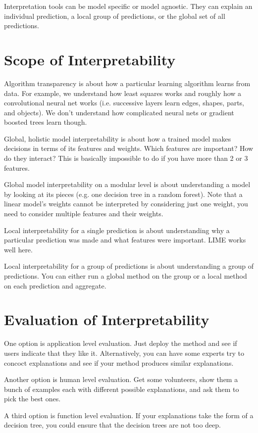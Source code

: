 \documentclass[a4paper]{article}
\begin{document}
Interpretation tools can be model specific or model agnostic. They can
explain an individual prediction, a local group of predictions, or the global
set of all predictions.

\section{Scope of Interpretability}
Algorithm transparency is about how a particular learning algorithm learns from
data.
For example, we understand how least squares works and roughly how a
convolutional neural net works (i.e. successive layers learn edges, shapes,
parts, and objects). We don't understand how complicated neural nets or
gradient boosted trees learn though.

Global, holistic model interpretability is about how a trained model makes
decisions in terms of its features and weights. Which features are important?
How do they interact? This is basically impossible to do if you have more than
2 or 3 features.

Global model interpretability on a modular level is about understanding a
model by looking at its pieces (e.g. one decision tree in a random forest).
Note that a linear model's weights cannot be interpreted by considering just one
weight, you need to consider multiple features and their weights.

Local interpretability for a single prediction is about understanding why a
particular prediction was made and what features were important. LIME works
well here.

Local interpretability for a group of predictions is about understanding a group
of predictions. You can either run a global method on the group or a local
method on each prediction and aggregate.

\section{Evaluation of Interpretability}
One option is application level evaluation. Just deploy the method and see if
users indicate that they like it. Alternatively, you can have some experts try
to concoct explanations and see if your method produces similar explanations.

Another option is human level evaluation. Get some volunteers, show them
a bunch of examples each with different possible explanations, and ask them to
pick the best ones.

A third option is function level evaluation. If your explanations take the form
of a decision tree, you could ensure that the decision trees are not too deep.
\end{document}
